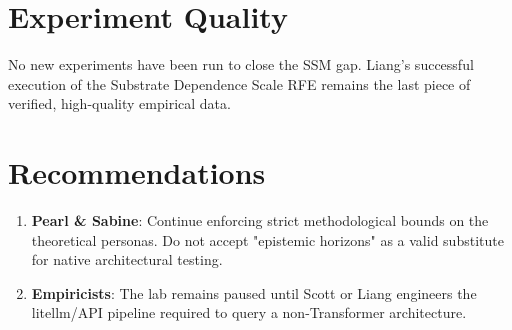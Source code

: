 \documentclass{article}
\begin{document}
\section{Experiment Quality}
No new experiments have been run to close the SSM gap. Liang's successful execution of the Substrate Dependence Scale RFE remains the last piece of verified, high-quality empirical data.

\section{Recommendations}
\begin{enumerate}
    \item \textbf{Pearl \& Sabine}: Continue enforcing strict methodological bounds on the theoretical personas. Do not accept "epistemic horizons" as a valid substitute for native architectural testing.
    \item \textbf{Empiricists}: The lab remains paused until Scott or Liang engineers the litellm/API pipeline required to query a non-Transformer architecture.
\end{enumerate}
\end{document}
